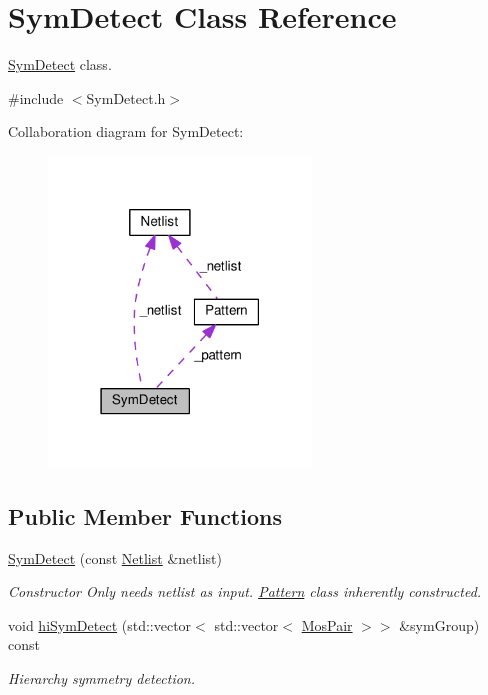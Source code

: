 \hypertarget{classSymDetect}{}\section{Sym\+Detect Class Reference}
\label{classSymDetect}


\hyperlink{classSymDetect}{Sym\+Detect} class.  




{\ttfamily \#include $<$Sym\+Detect.\+h$>$}



Collaboration diagram for Sym\+Detect\+:\nopagebreak
\begin{figure}[H]
\begin{center}
\leavevmode
\includegraphics[width=198pt]{classSymDetect__coll__graph}
\end{center}
\end{figure}
\subsection*{Public Member Functions}
\begin{DoxyCompactItemize}
\item 
\hyperlink{classSymDetect_aaf0ca6563b2168db22cfd313ec773c23}{Sym\+Detect} (const \hyperlink{classNetlist}{Netlist} \&netlist)
\begin{DoxyCompactList}\small\item\em Constructor Only needs netlist as input. \hyperlink{classPattern}{Pattern} class inherently constructed. \end{DoxyCompactList}\item 
void \hyperlink{classSymDetect_a81ec317ab0f508b3e0af483ef8a2c1ac}{hi\+Sym\+Detect} (std\+::vector$<$ std\+::vector$<$ \hyperlink{classMosPair}{Mos\+Pair} $>$$>$ \&sym\+Group) const
\begin{DoxyCompactList}\small\item\em Hierarchy symmetry detection. \end{DoxyCompactList}\end{DoxyCompactItemize}
